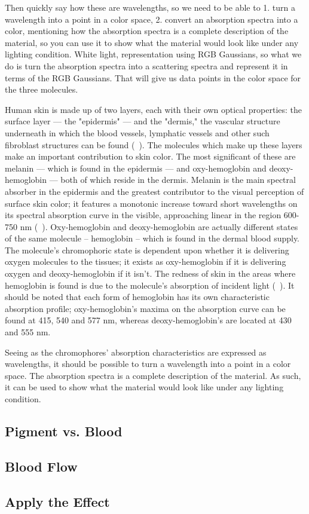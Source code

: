 Then quickly say how these are wavelengths, so we need to be able to 1. turn a wavelength into a point in a color space, 2. convert an absorption spectra into a color, mentioning how the absorption spectra is a complete description of the material, so you can use it to show what the material would look like under any lighting condition. White light, representation using RGB Gaussians, so what we do is turn the absorption spectra into a scattering spectra and represent it in terms of the RGB Gaussians. That will give us data points in the color space for the three molecules.

Human skin is made up of two layers, each with their own optical properties: the surface layer --- the "epidermis" --- and the "dermis," the vascular structure underneath in which the blood vessels, lymphatic vessels and other such fibroblast structures can be found (~\cite{Stamatas2004}). The molecules which make up these layers make an important contribution to skin color. The most significant of these are melanin --- which is found in the epidermis --- and oxy-hemoglobin and deoxy-hemoglobin --- both of which reside in the dermis. Melanin is the main spectral absorber in the epidermis and the greatest contributor to the visual perception of surface skin color; it features a monotonic increase toward short wavelengths on its spectral absorption curve in the visible, approaching linear in the region 600-750 nm (~\cite{Stamatas2004,Kollias1995}). Oxy-hemoglobin and deoxy-hemoglobin are actually different states of the same molecule -- hemoglobin -- which is found in the dermal blood supply. The molecule's chromophoric state is dependent upon whether it is delivering oxygen molecules to the tissues; it exists as oxy-hemoglobin if it is delivering oxygen and deoxy-hemoglobin if it isn't. The redness of skin in the areas where hemoglobin is found is due to the molecule's absorption of incident light (~\cite{Kollias1995}). It should be noted that each form of hemoglobin has its own characteristic absorption profile; oxy-hemoglobin's maxima on the absorption curve can be found at 415, 540 and 577 nm, whereas deoxy-hemoglobin's are located at 430 and 555 nm.

Seeing as the chromophores' absorption characteristics are expressed as wavelengths, it should be possible to turn a wavelength into a point in a color space. The absorption spectra is a complete description of the material. As such, it can be used to show what the material would look like under any lighting condition. 

\subsection{Pigment vs. Blood}\label{sec:PigmentVs.Blood}

\subsection{Blood Flow}\label{sec:BloodFlow}

\subsection{Apply the Effect}\label{sec:ApplyTheEffect}

